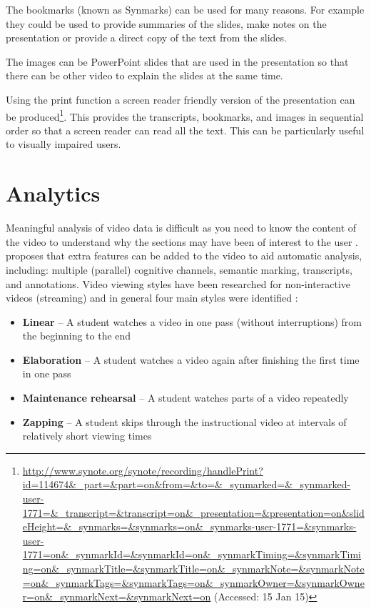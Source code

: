 The bookmarks (known as Synmarks) can be used for many reasons. For example they could be used to provide summaries of the slides, make notes on the presentation or provide a direct copy of the text from the slides.

The images can be PowerPoint slides that are used in the presentation so that there can be other video to explain the slides at the same time.

Using the print function a screen reader friendly version of the presentation can be produced\footnote{\url{http://www.synote.org/synote/recording/handlePrint?id=114674&_part=&part=on&from=&to=&_synmarked=&_synmarked-user-1771=&_transcript=&transcript=on&_presentation=&presentation=on&slideHeight=&_synmarks=&synmarks=on&_synmarks-user-1771=&synmarks-user-1771=on&_synmarkId=&synmarkId=on&_synmarkTiming=&synmarkTiming=on&_synmarkTitle=&synmarkTitle=on&_synmarkNote=&synmarkNote=on&_synmarkTags=&synmarkTags=on&_synmarkOwner=&synmarkOwner=on&_synmarkNext=&synmarkNext=on} (Accessed: 15 Jan 15)}. This provides the transcripts, bookmarks, and images in sequential order so that a screen reader can read all the text. This can be particularly useful to visually impaired users.

\section{Analytics}
\label{Section:Analytics}
Meaningful analysis of video data is difficult as you need to know the content of the video to understand why the sections may have been of interest to the user \citep{videoLectures}.  \citep{videoLectures} proposes that extra features can be added to the video to aid automatic analysis, including: multiple (parallel) cognitive channels, semantic marking, transcripts, and annotations. Video viewing styles have been researched for non-interactive videos (streaming) and in general four main styles were identified \citep{DeBoer}:
\begin{itemize}
	\item \textbf{Linear} -- A student watches a video in one pass (without interruptions) from the beginning to the end
	\item \textbf{Elaboration} -- A student watches a video again after finishing the first time in one pass
	\item \textbf{Maintenance rehearsal} -- A student watches parts of a video repeatedly
	\item \textbf{Zapping} -- A student skips through the instructional video at intervals of relatively short viewing times
\end{itemize}

